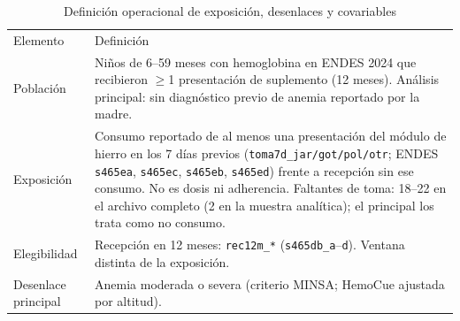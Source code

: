 \documentclass[man,11pt,donotrepeattitle,floatsintext]{apa7}
\begin{document}
\begin{table}[htbp]
	\centering
	\caption{Definición operacional de exposición, desenlaces y covariables}
	\label{tab:ops}
	\small
	\begingroup
	\renewcommand{\arraystretch}{1.15}
	\setlength{\tabcolsep}{6.9pt}
	\setlength{\heavyrulewidth}{0.75pt}
	\setlength{\lightrulewidth}{0.5pt}
	\begin{tabular}{p{3.1cm}p{12.2cm}}
		\toprule
		Elemento               & Definición                                                                                                                                                                                                                                                                                                                                                                                  \\
		\noalign{\setlength{\lightrulewidth}{0.75pt}}
		\midrule
		\noalign{\setlength{\lightrulewidth}{0.5pt}}
		Población              & Niños de 6--59 meses con hemoglobina en ENDES 2024 que recibieron $\ge$1 presentación de suplemento (12 meses). Análisis principal: sin diagnóstico previo de anemia reportado por la madre.                                                                                                                                                                                                \\
		Exposición             & Consumo reportado de al menos una presentación del módulo de hierro en los 7 días previos (\texttt{toma7d\_jar/got/pol/otr}; ENDES \texttt{s465ea}, \texttt{s465ec}, \texttt{s465eb}, \texttt{s465ed}) frente a recepción sin ese consumo. No es dosis ni adherencia. Faltantes de toma: 18--22 en el archivo completo (2 en la muestra analítica); el principal los trata como no consumo. \\
		Elegibilidad           & Recepción en 12 meses: \texttt{rec12m\_*} (\texttt{s465db\_a}--\texttt{d}). Ventana distinta de la exposición.                                                                                                                                                                                                                                                                              \\
		Desenlace principal    & Anemia moderada o severa (criterio MINSA; HemoCue ajustada por altitud).                                                                                                                                                                                                                                                                                                                    \\

\end{tabular}
\end{table}
\end{document}
